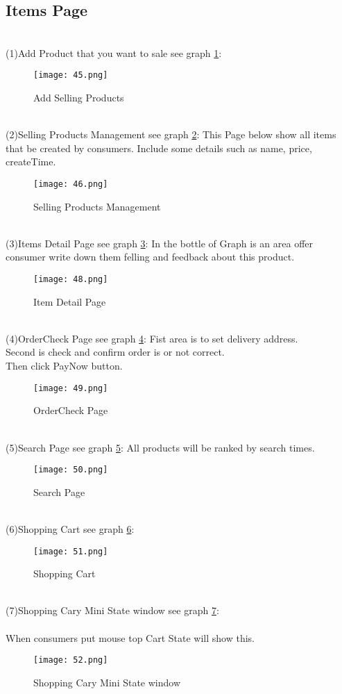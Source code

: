 \subsection{Items Page}
\\
(1)Add Product that you want to sale see graph \ref{fig:25 cubed graph}:
\begin{figure}[h]
	\centering
	\texttt{[image: 45.png]}
	\caption{Add Selling Products}
	\label{fig:25 cubed graph}
\end{figure}
\\
(2)Selling Products Management see graph \ref{fig:26 cubed graph}:
This Page below show all items that be created by consumers. Include some details such as name, price, createTime.\\
\begin{figure}[h]
	\centering
	\texttt{[image: 46.png]}
	\caption{Selling Products Management}
	\label{fig:26 cubed graph}
\end{figure}
\\
(3)Items Detail Page see graph \ref{fig:28 cubed graph}:
In the bottle of Graph is an area offer consumer write down them felling and feedback about this product.\\ 
\begin{figure}[h]
	\centering
	\texttt{[image: 48.png]}
	\caption{Item Detail Page}
	\label{fig:28 cubed graph}
\end{figure}
\\
(4)OrderCheck Page see graph \ref{fig:29 cubed graph}:
Fist area is to set delivery address.\\
Second is check and confirm order is or not correct.\\
Then click PayNow button.\\
\begin{figure}[h]
	\centering
	\texttt{[image: 49.png]}
	\caption{OrderCheck Page}
	\label{fig:29 cubed graph}
\end{figure}
\\
(5)Search Page see graph \ref{fig:30 cubed graph}:
All products will be ranked by search times.\\
\begin{figure}[h]
	\centering
	\texttt{[image: 50.png]}
	\caption{Search Page}
	\label{fig:30 cubed graph}
\end{figure}
\\
(6)Shopping Cart see graph \ref{fig:31 cubed graph}:
\\
\begin{figure}[h]
	\centering
	\texttt{[image: 51.png]}
	\caption{Shopping Cart}
	\label{fig:31 cubed graph}
\end{figure}
\\
(7)Shopping Cary Mini State window see graph \ref{fig:32 cubed graph}:
\\
\\
When consumers put mouse top Cart State will show this.\\
\begin{figure}[h]
	\centering
	\texttt{[image: 52.png]}
	\caption{Shopping Cary Mini State window}
	\label{fig:32 cubed graph}
\end{figure}
\\